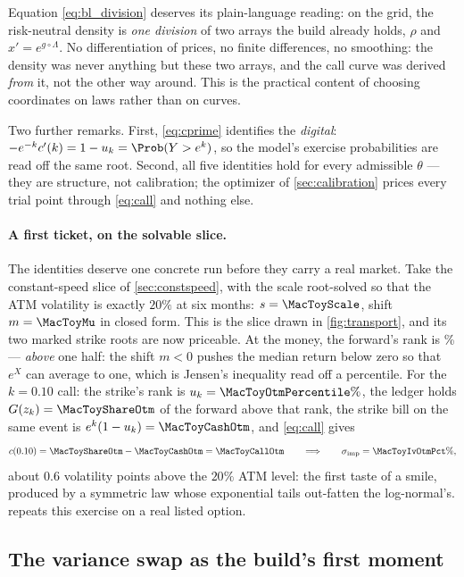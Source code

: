 Equation \eqref{eq:bl_division} deserves its plain-language reading: on
the grid, the risk-neutral density is \emph{one division} of two arrays
the build already holds, $\rho$ and $x'=e^{g\circ\Lambda}$.  No
differentiation of prices, no finite differences, no smoothing: the
density was never anything but these two arrays, and the call curve was
derived \emph{from} it, not the other way around.  This is the practical
content of choosing coordinates on laws rather than on curves.

Two further remarks.  First, \eqref{eq:cprime} identifies the
\emph{digital}: $-e^{-k}c'(k)=1-u_k=\Prob(Y>e^{k})$, so the model's
exercise probabilities are read off the same root.  Second, all five
identities hold for every admissible $\theta$ --- they are structure, not
calibration; the optimizer of \cref{sec:calibration} prices every trial
point through \eqref{eq:call} and nothing else.

\paragraph{A first ticket, on the solvable slice.}
The identities deserve one concrete run before they carry a real market.
Take the constant-speed slice of \cref{sec:constspeed}, with the scale
root-solved so that the ATM volatility is exactly $20\%$ at six months:
$s=\MacToyScale$, shift $m=\MacToyMu$ in closed form.  This is the slice
drawn in \cref{fig:transport}, and its two marked strike roots are now
priceable.  At the money, the forward's rank is
\MacToyAtmPercentile\% --- \emph{above} one half: the shift $m<0$ pushes
the median return below zero so that $e^{X}$ can average to one, which
is Jensen's inequality read off a percentile.  For the $k=0.10$ call:
the strike's rank is $u_k=\MacToyOtmPercentile\%$, the ledger holds
$G(z_k)=\MacToyShareOtm$ of the forward above that rank, the strike bill
on the same event is $e^{k}(1-u_k)=\MacToyCashOtm$, and
\eqref{eq:call} gives
\[
c(0.10)=\MacToyShareOtm-\MacToyCashOtm=\MacToyCallOtm
\qquad\Longrightarrow\qquad
\sigma_{\mathrm{imp}}=\MacToyIvOtmPct\%,
\]
about $0.6$ volatility points above the $20\%$ ATM level: the first
taste of a smile, produced by a symmetric law whose exponential tails
out-fatten the log-normal's.   repeats this exercise
on a real listed option.

\subsection{The variance swap as the build's first moment}

